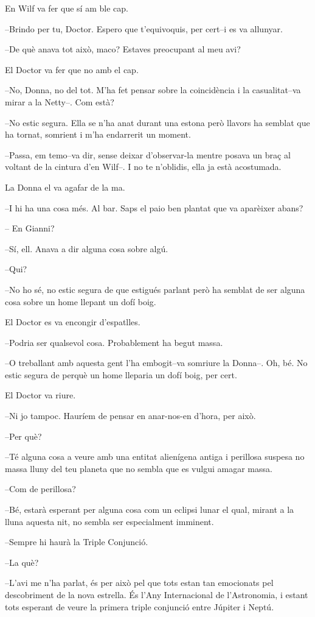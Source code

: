 En Wilf va fer que sí am ble cap.

--Brindo per tu, Doctor. Espero que t'equivoquis, per cert--i es va
allunyar.

--De què anava tot això, maco? Estaves preocupant al meu avi?

El Doctor va fer que no amb el cap.

--No, Donna, no del tot. M'ha fet pensar sobre la coincidència i la
casualitat--va mirar a la Netty--. Com està?

--No estic segura. Ella se n'ha anat durant una estona però llavors ha
semblat que ha tornat, somrient i m'ha endarrerit un moment.

--Passa, em temo--va dir, sense deixar d'observar-la mentre posava un
braç al voltant de la cintura d'en Wilf--. I no te n'oblidis, ella ja
està acostumada.

La Donna el va agafar de la ma.

--I hi ha una cosa més. Al bar. Saps el paio ben plantat que va
aparèixer abans?

-- En Gianni?

--Sí, ell. Anava a dir alguna cosa sobre algú.

--Qui?

--No ho sé, no estic segura de que estigués parlant però ha semblat de
ser alguna cosa sobre un home llepant un dofí boig.

El Doctor es va encongir d'espatlles.

--Podria ser qualsevol cosa. Probablement ha begut massa.

--O treballant amb aquesta gent l'ha embogit--va somriure la Donna--.
Oh, bé. No estic segura de perquè un home lleparia un dofí boig, per
cert.

El Doctor va riure.

--Ni jo tampoc. Hauríem de pensar en anar-nos-en d'hora, per això.

--Per què?

--Té alguna cosa a veure amb una entitat alienígena antiga i perillosa
suspesa no massa lluny del teu planeta que no sembla que es vulgui
amagar massa.

--Com de perillosa?

--Bé, estarà esperant per alguna cosa com un eclipsi lunar el qual,
mirant a la lluna aquesta nit, no sembla ser especialment imminent.

--Sempre hi haurà la Triple Conjunció.

--La què?

--L'avi me n'ha parlat, és per això pel que tots estan tan emocionats
pel descobriment de la nova estrella. És l'Any Internacional de
l'Astronomia, i estant tots esperant de veure la primera triple
conjunció entre Júpiter i Neptú.

